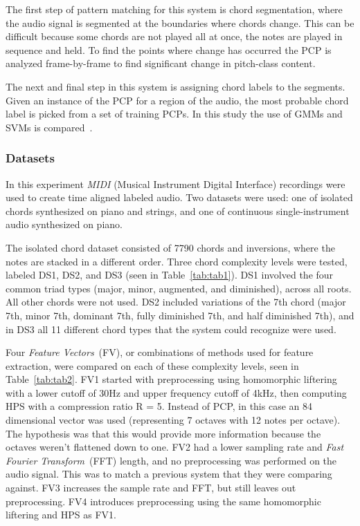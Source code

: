 \documentclass{sig-alternate}
\begin{document}
The first step of pattern matching for this system is chord segmentation, where the audio signal is segmented at the boundaries where chords change. This can be difficult because some chords are not played all at once, the notes are played in sequence and held. To find the points where change has occurred the PCP is analyzed frame-by-frame to find significant change in pitch-class content. 


The next and final step in this system is assigning chord labels to the segments. Given an instance of the PCP for a region of the audio, the most probable chord label is picked from a set of training PCPs. In this study the use of GMMs and SVMs is compared~\cite{Morman:2006}.

\subsubsection{Datasets}

In this experiment \textit{MIDI} (Musical Instrument Digital Interface) recordings were used to create time aligned labeled audio. Two datasets were used: one of isolated chords synthesized on piano and strings, and one of continuous single-instrument audio synthesized on piano. 

The isolated chord dataset consisted of 7790 chords and inversions, where the notes are stacked in a different order. Three chord complexity levels were tested, labeled DS1, DS2, and DS3 (seen in Table~\ref{tab:tab1}). DS1 involved the four common triad types (major, minor, augmented, and diminished), across all roots. All other chords were not used. DS2 included variations of the 7th chord (major 7th, minor 7th, dominant 7th, fully diminished 7th, and half diminished 7th), and in DS3 all 11 different chord types that the system could recognize were used.

Four \textit{Feature Vectors}~(FV), or combinations of methods used for feature extraction, were compared on each of these complexity levels, seen in Table~\ref{tab:tab2}. FV1 started with preprocessing using homomorphic liftering with a lower cutoff of 30Hz and upper frequency cutoff of 4kHz, then computing HPS with a compression ratio R = 5. Instead of PCP, in this case an 84 dimensional vector was used (representing 7 octaves with 12 notes per octave). The hypothesis was that this would provide more information because the octaves weren't flattened down to one. FV2 had a lower sampling rate and \textit{Fast Fourier Transform}~(FFT) length, and no preprocessing was performed on the audio signal. This was to match a previous system that they were comparing against. FV3 increases the sample rate and FFT, but still leaves out preprocessing. FV4 introduces preprocessing using the same homomorphic liftering and HPS as FV1.
\end{document}
